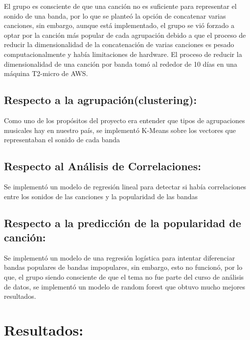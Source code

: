 \documentclass[11pt]{article}
\begin{document}
El grupo es consciente de que una canción no es suficiente para representar el sonido de una banda, por lo que se planteó la opción de concatenar varias canciones, sin embargo, aunque está implementado, el grupo se vió forzado a optar por la canción más popular de cada agrupación debido a que el proceso de reducir la dimensionalidad de la concatenación de varias canciones es pesado computacionalmente y había limitaciones de hardware. El proceso de reducir la dimensionalidad de una canción por banda tomó al rededor de 10 días en una máquina T2-micro de AWS.

\subsection{Respecto a la agrupación(clustering):}
\label{sec:orgff1d984}
Como uno de los propósitos del proyecto era entender que tipos de agrupaciones musicales hay en nuestro país, se implementó K-Means sobre los vectores que representaban el sonido de cada banda

\subsection{Respecto al Análisis de Correlaciones:}
\label{sec:org0803b00}
Se implementó un modelo de regresión lineal para detectar si había correlaciones entre los sonidos de las canciones y la popularidad de las bandas

\subsection{Respecto a la predicción de la popularidad de canción:}
\label{sec:org3afc9b7}
Se implementó un modelo de una regresión logística para intentar diferenciar bandas populares de bandas impopulares, sin embargo, esto no funcionó, por lo que, el grupo siendo consciente de que el tema no fue parte del curso de análisis de datos, se implementó un modelo de random forest que obtuvo mucho mejores resultados.

\section{Resultados:}
\label{sec:org74214c4}
\end{document}

